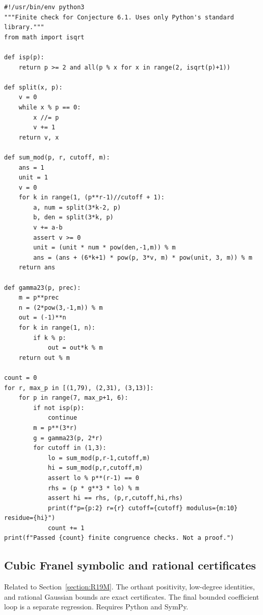 \documentclass[11pt,a4paper]{article}
\begin{document}
\begin{Verbatim}[fontsize=\scriptsize,breaklines,breakanywhere]
#!/usr/bin/env python3
"""Finite check for Conjecture 6.1. Uses only Python's standard library."""
from math import isqrt

def isp(p):
    return p >= 2 and all(p % x for x in range(2, isqrt(p)+1))

def split(x, p):
    v = 0
    while x % p == 0:
        x //= p
        v += 1
    return v, x

def sum_mod(p, r, cutoff, m):
    ans = 1
    unit = 1
    v = 0
    for k in range(1, (p**r-1)//cutoff + 1):
        a, num = split(3*k-2, p)
        b, den = split(3*k, p)
        v += a-b
        assert v >= 0
        unit = (unit * num * pow(den,-1,m)) % m
        ans = (ans + (6*k+1) * pow(p, 3*v, m) * pow(unit, 3, m)) % m
    return ans

def gamma23(p, prec):
    m = p**prec
    n = (2*pow(3,-1,m)) % m
    out = (-1)**n
    for k in range(1, n):
        if k % p:
            out = out*k % m
    return out % m

count = 0
for r, max_p in [(1,79), (2,31), (3,13)]:
    for p in range(7, max_p+1, 6):
        if not isp(p):
            continue
        m = p**(3*r)
        g = gamma23(p, 2*r)
        for cutoff in (1,3):
            lo = sum_mod(p,r-1,cutoff,m)
            hi = sum_mod(p,r,cutoff,m)
            assert lo % p**(r-1) == 0
            rhs = (p * g**3 * lo) % m
            assert hi == rhs, (p,r,cutoff,hi,rhs)
            print(f"p={p:2} r={r} cutoff={cutoff} modulus={m:10} residue={hi}")
            count += 1
print(f"Passed {count} finite congruence checks. Not a proof.")
\end{Verbatim}
\subsection{Cubic Franel symbolic and rational certificates}
\noindent Related to Section~\ref{section:R19M}. The orthant positivity, low-degree identities, and rational Gaussian bounds are exact certificates. The final bounded coefficient loop is a separate regression. Requires Python and SymPy.
\end{document}
